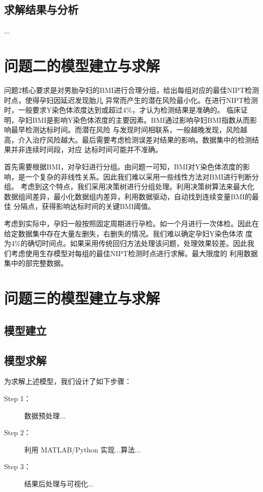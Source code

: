 \documentclass[withoutpreface,notoc]{cumcmthesis}
\begin{document}
	
	\subsection{求解结果与分析}
	...
	
	\section{问题二的模型建立与求解}

	问题2核心要求是对男胎孕妇的BMI进行合理分组，给出每组对应的最佳NIPT检测时点，使得孕妇因延迟发现胎儿
	异常而产生的潜在风险最小化。在进行NIPT检测时，一般要求Y染色体浓度达到或超过4\%，才认为检测结果是准确的。
	临床证明，孕妇BMI是影响Y染色体浓度的主要因素。BMI通过影响孕妇BMI指数从而影响最早检测达标时间。而潜在风险
	与发现时间相联系，一般越晚发现，风险越高，介入治疗风险越大。最后需要考虑检测误差对结果的影响。数据集中的检测结果并非连续时间段，对应
	达标时间可能并不准确。

	首先需要根据BMI，对孕妇进行分组。由问题一可知，BMI对Y染色体浓度的影响，是一个复杂的非线性关系。因此我们难以采用一些线性方法对BMI进行判断分组。
	考虑到这个特点，我们采用决策树进行分组处理。利用决策树算法来最大化数据组间差异，最小化数据组内差异，利用数据驱动，自动找到连续变量BMI的最佳
	分隔点，获得影响达标时间的关键BMI阈值。

	考虑到实际中，孕妇一般按照固定周期进行孕检。如一个月进行一次体检。因此在给定数据集中存在大量左删失，右删失的情况。我们难以确定孕妇Y染色体浓
	度为4\%的确切时间点。如果采用传统回归方法处理该问题，处理效果较差。因此我们考虑使用生存模型对每组的最佳NIPT检测时点进行求解。最大限度的
	利用数据集中的部完整数据。







	\section{问题三的模型建立与求解}

	\subsection{模型建立}
	\subsection{模型求解}
	为求解上述模型，我们设计了如下步骤：
	
	\begin{description}
		\item[Step 1：] 数据预处理...
		\item[Step 2：] 利用 MATLAB/Python 实现...算法...
		\item[Step 3：] 结果后处理与可视化...
	\end{description}
\end{document}
